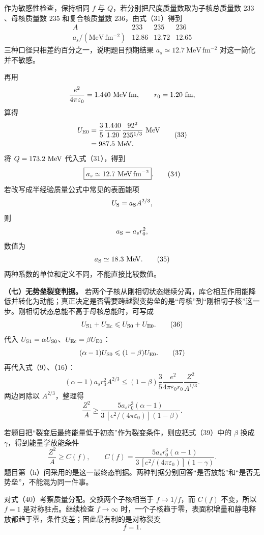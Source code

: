 \documentclass[12pt,a4paper,UTF8]{ctexart}
\begin{document}
作为敏感性检查，保持相同 \(f\) 与
\(Q\)，若分别把尺度质量数取为子核总质量数 \(233\)、母核质量数 \(235\)
和复合核质量数 \(236\)，由式（31）得到 \[
\begin{array}{c|ccc}
A&233&235&236\\ \hline
a_s/(\mathrm{MeV\,fm^{-2}})
&12.86&12.72&12.65
\end{array}
\] 三种口径只相差约百分之一，说明题目预期结果
\(a_s\simeq12.7\ \mathrm{MeV\,fm^{-2}}\) 对这一简化并不敏感。

再用 \[
\frac{e^2}{4\pi\varepsilon_0}=1.440\ {\rm MeV\,fm},
\qquad
r_0=1.20\ {\rm fm},
\] 算得 \[
\begin{aligned}
U_{\rm E0}
&=\frac35\frac{1.440}{1.20}
\frac{92^2}{235^{1/3}}\ {\rm MeV}\\
&=987.5\ {\rm MeV}. 
\end{aligned} \tag{33}
\] 将 \(Q=173.2\ {\rm MeV}\) 代入式（31），得到 \[
\boxed{
a_s\simeq12.7\ {\rm MeV\,fm^{-2}}
}. \tag{34}
\] 若改写成半经验质量公式中常见的表面能项 \[
U_{\rm S}=a_{\rm S}A^{2/3},
\] 则 \[
a_{\rm S}=a_sr_0^2,
\] 数值为 \[
a_{\rm S}\simeq18.3\ {\rm MeV}. \tag{35}
\] 两种系数的单位和定义不同，不能直接比较数值。

\textbf{（七）无势垒裂变判据。}
若两个子核从刚相切状态继续分离，库仑相互作用能降低并转化为动能；真正决定是否需要跨越裂变势垒的是``母核''到``刚相切子核''这一步。刚相切状态总能不高于母核总能时，可写成
\[
U_{\rm S1}+U_{\rm Ec}
\leqslant U_{\rm S0}+U_{\rm E0}. \tag{36}
\] 代入
\(U_{\rm S1}=\alpha U_{\rm S0}\)、\(U_{\rm Ec}=\beta U_{\rm E0}\)： \[
(\alpha-1)U_{\rm S0}
\leqslant(1-\beta)U_{\rm E0}. \tag{37}
\] 再代入式（9）、（16）： \[
(\alpha-1)a_sr_0^2A^{2/3}
\leqslant
(1-\beta)\frac35
\frac{e^2}{4\pi\varepsilon_0r_0}
\frac{Z^2}{A^{1/3}}. \tag{38}
\] 两边同除以 \(A^{2/3}\)，整理得 \[
\boxed{
\frac{Z^2}{A}
\geqslant
\frac{
5a_sr_0^3(\alpha-1)
}{
3\,[e^2/(4\pi\varepsilon_0)](1-\beta)
}
}. \tag{39}
\]

若题目把``裂变后最终能量低于初态''作为裂变条件，则应把式（39）中的
\(\beta\) 换成 \(\gamma\)，得到能量学放能条件 \[
\boxed{
\frac{Z^2}{A}
\geqslant
C(f),
\qquad
C(f)=
\frac{
5a_sr_0^3(\alpha-1)
}{
3\,[e^2/(4\pi\varepsilon_0)](1-\gamma)
}
}. \tag{40}
\]
题目第（h）问采用的是这一最终态判据。两种判据分别回答``是否放能''和``是否无势垒''，不能混为同一件事。

对式（40）考察质量分配。交换两个子核相当于 \(f\mapsto1/f\)，而 \(C(f)\)
不变，所以 \(f=1\) 是对称驻点。继续检查 \(f\to\infty\)
时，一个子核趋于零，表面积增量和静电释放都趋于零，条件变差；因此最有利的是对称裂变
\[
\boxed{f=1}. \tag{41}
\]
\end{document}
